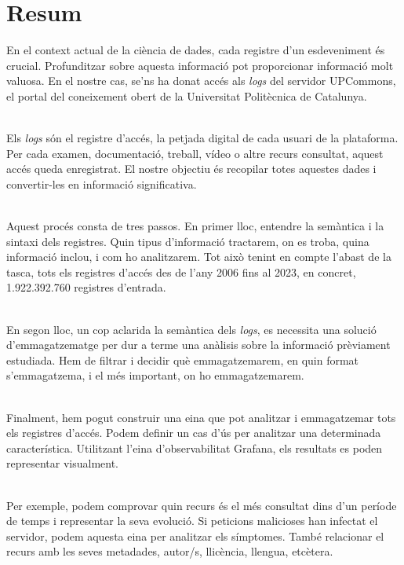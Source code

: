 \chapter*{Resum}\label{ch:abstract-ca}

En el context actual de la ciència de dades, cada registre d'un esdeveniment és crucial.
Profunditzar sobre aquesta informació pot proporcionar informació molt valuosa.
En el nostre cas, se'ns ha donat accés als \textit{\gls{log}s} del servidor UPCommons, el portal del coneixement obert de la Universitat Politècnica de Catalunya.

\noindent \\
Els \textit{\gls{log}s} són el registre d'accés, la petjada digital de cada usuari de la plataforma.
Per cada examen, documentació, treball, vídeo o altre recurs consultat, aquest accés queda enregistrat.
El nostre objectiu és recopilar totes aquestes dades i convertir-les en informació significativa.

\noindent \\
Aquest procés consta de tres passos.
En primer lloc, entendre la semàntica i la sintaxi dels registres.
Quin tipus d'informació tractarem, on es troba, quina informació inclou, i com ho analitzarem.
Tot això tenint en compte l'abast de la tasca, tots els registres d'accés des de l'any 2006 fins al 2023, en concret, 1.922.392.760 registres d'entrada.

\noindent \\
En segon lloc, un cop aclarida la semàntica dels \textit{\gls{log}s}, es necessita una solució d'emmagatzematge per dur a terme una anàlisis sobre la informació prèviament estudiada.
Hem de filtrar i decidir què emmagatzemarem, en quin format s'emmagatzema, i el més important, on ho emmagatzemarem.

\noindent \\
Finalment, hem pogut construir una eina que pot analitzar i emmagatzemar tots els registres d'accés.
Podem definir un cas d'ús per analitzar una determinada característica.
Utilitzant l'eina d'observabilitat Grafana, els resultats es poden representar visualment.

\noindent \\
Per exemple, podem comprovar quin recurs és el més consultat dins d'un període de temps i representar la seva evolució.
Si peticions malicioses han infectat el servidor, podem aquesta eina per analitzar els símptomes.
També relacionar el recurs amb les seves metadades, autor/s, llicència, llengua, etcètera.

